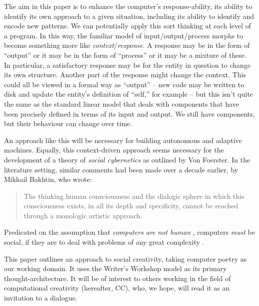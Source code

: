 The aim in this paper is to enhance the computer's response-ability,
its ability to identify its own approach to a given situation,
including its ability to identify and encode new patterns.  We can
potentially apply this sort thinking at each level of a program.  In
this way, the familiar model of input/output/process morphs to become
something more like \emph{context}/\emph{response}.  A response may be
in the form of ``output'' or it may be in the form of ``process'' or
it may be a mixture of these.  In particular, a satisfactory response
may be for the entity in question to change its own structure.
Another part of the response might change the context.  This could all
be viewed in a formal way as ``output'' -- new code may be written to
disk and update the entity's definition of ``self,'' for example --
but this isn't quite the same as the standard linear model that deals
with components that have been precisely defined in terms of its input
and output.  We still have components, but their behaviour can change
over time.

An approach like this will be necessary for building autonomous and
adaptive machines.  Equally, this context-driven approach seems
necessary for the development of a theory of \emph{social cybernetics}
as outlined by Von Foerster.  In the literature setting, similar
comments had been made over a decade earlier, by Mikhail Bakhtin, who
wrote:
\begin{quote}
The thinking human consciousness and the dialogic sphere in which this
consciousness exists, in all its depth and specificity, cannot be
reached through a monologic artistic approach.\\ 
\end{quote}

Predicated on the assumption that \emph{computers are not human}
\citep[pp. 12, 18]{colton2012painting}, computers \emph{must} be
social, if they are to deal with problems of any great complexity
\citep{minsky1967programming,society-of-mind}.

This paper outlines an approach to social creativity, taking computer
poetry as our working domain.  It uses the Writer's Workshop model
\cite{gabriel2002writer} as its primary thought-architecture.  It will
be of interest to others working in the field of computational
creativity (hereafter, CC), who, we hope, will read it as an
invitation to a dialogue.

